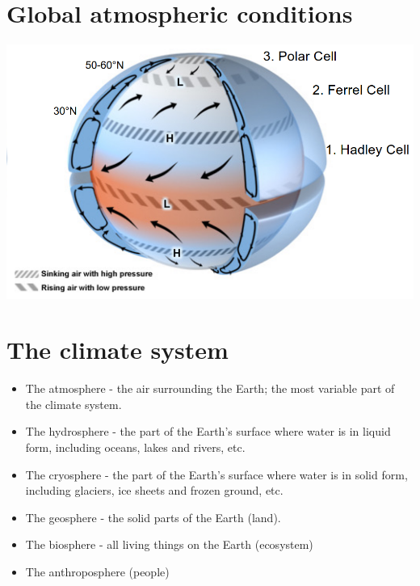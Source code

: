 \documentclass[11pt]{article}
\begin{document}
\section{Global atmospheric conditions}
\label{sec:org5fafaf1}
\begin{center}
\includegraphics[width=.9\linewidth]{./images/global-atmospheric-circulations.png}
\end{center}
\section{The climate system}
\label{sec:orgf57aadb}
\begin{itemize}
\item The atmosphere - the air surrounding the Earth; the most variable part of the climate system.
\item The hydrosphere - the part of the Earth's surface where water is in liquid form, including oceans, lakes and rivers, etc.
\item The cryosphere - the part of the Earth's surface where water is in solid form, including glaciers, ice sheets and frozen ground, etc.
\item The geosphere - the solid parts of the Earth (land).
\item The biosphere - all living things on the Earth (ecosystem)
\item The anthroposphere (people)
\end{itemize}

\newpage
\end{document}
